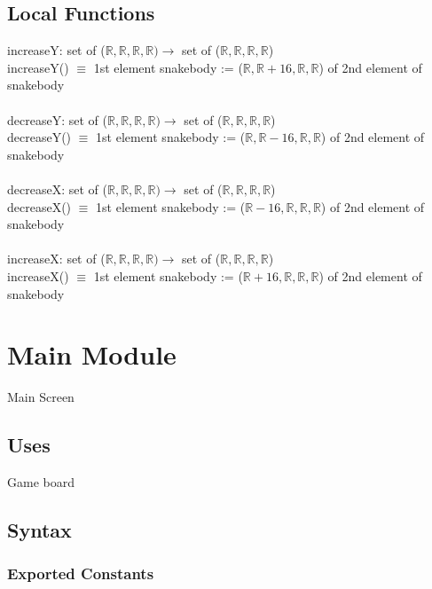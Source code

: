 \documentclass[12pt, titlepage]{article}
\begin{document}
\subsection*{Local Functions}
increaseY: set of ($\mathbb{R}, \mathbb{R}, \mathbb{R}, \mathbb{R}) \rightarrow$ set of ($\mathbb{R}, \mathbb{R}, \mathbb{R}, \mathbb{R}$)\\
\noindent increaseY() $\equiv$ 1st element snakebody := ($\mathbb{R}, \mathbb{R}+16, \mathbb{R}, \mathbb{R}$) of 2nd element of snakebody\\\\
decreaseY: set of ($\mathbb{R}, \mathbb{R}, \mathbb{R}, \mathbb{R}) \rightarrow$ set of ($\mathbb{R}, \mathbb{R}, \mathbb{R}, \mathbb{R}$)\\
\noindent decreaseY() $\equiv$ 1st element snakebody := ($\mathbb{R}, \mathbb{R}-16, \mathbb{R}, \mathbb{R}$) of 2nd element of snakebody\\\\
decreaseX: set of ($\mathbb{R}, \mathbb{R}, \mathbb{R}, \mathbb{R}) \rightarrow$ set of ($\mathbb{R}, \mathbb{R}, \mathbb{R}, \mathbb{R}$)\\
\noindent decreaseX() $\equiv$ 1st element snakebody := ($\mathbb{R}-16, \mathbb{R}, \mathbb{R}, \mathbb{R}$) of 2nd element of snakebody\\\\
increaseX: set of ($\mathbb{R}, \mathbb{R}, \mathbb{R}, \mathbb{R}) \rightarrow$ set of ($\mathbb{R}, \mathbb{R}, \mathbb{R}, \mathbb{R}$)\\
\noindent increaseX() $\equiv$ 1st element snakebody := ($\mathbb{R}+16, \mathbb{R}, \mathbb{R}, \mathbb{R}$) of 2nd element of snakebody\\

\section{Main Module}

Main Screen

\subsection* {Uses}

Game board

\subsection* {Syntax}

\subsubsection* {Exported Constants}
\end{document}
